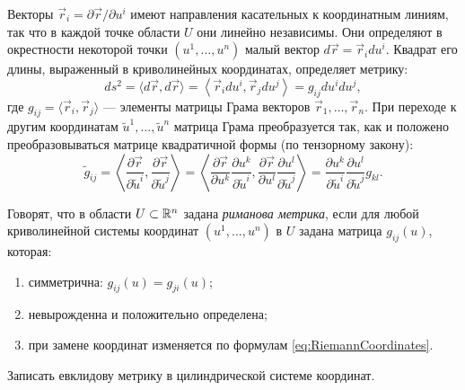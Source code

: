 Векторы $\vec{r}_i = \partial \vec{r} / \partial u^i$ имеют направления касательных к координатным линиям, так что в каждой точке области $U$ они линейно независимы. Они определяют в окрестности некоторой точки $(u^1, \ldots, u^n)$ малый вектор $d\vec{r} = \vec{r}_idu^i$. Квадрат его длины, выраженный в криволинейных координатах, определяет метрику:
\[
	ds^2 = \langle d\vec{r}, d\vec{r}\rangle = \left\langle\vec{r}_idu^i, \vec{r}_jdu^j\right\rangle = g_{ij}du^idu^j,
\]
где $g_{ij} = \langle\vec{r}_i, \vec{r}_j\rangle$ --- элементы матрицы Грама векторов $\vec{r}_1, \ldots, \vec{r}_n$. При переходе к другим координатам $\widetilde{u}^1, \ldots, \widetilde{u}^n$ матрица Грама преобразуется так, как и положено преобразовываться матрице квадратичной формы (по тензорному закону):
\begin{equation} \label{eq:RiemannCoordinates}
	\widetilde{g}_{ij} = \left\langle\frac{\partial \vec{r}}{\partial\widetilde{u}^i}, \frac{\partial \vec{r}}{\partial\widetilde{u}^j}\right\rangle = \left\langle\frac{\partial \vec{r}}{\partial u^k}\frac{\partial u^k}{\partial\widetilde{u}^i}, \frac{\partial \vec{r}}{\partial u^l}\frac{\partial u^l}{\partial\widetilde{u}^j}\right\rangle = \frac{\partial u^k}{\partial\widetilde{u}^i}\frac{\partial u^l}{\partial\widetilde{u}^j}g_{kl}.
\end{equation}

\begin{definition} \label{definition:RiemannMetrics}
	Говорят, что в области $U \subset \mathbb{R}^n$ задана \textit{риманова метрика}, если для любой криволинейной системы координат $(u^1, \ldots, u^n)$ в $U$ задана матрица $g_{ij}(u)$, которая:
	\begin{enumerate}[nolistsep, label=(\arabic*)]
		\item симметрична: $g_{ij}(u) = g_{ji}(u)$;
		\item невырожденна и положительно определена;
		\item при замене координат изменяется по формулам \eqref{eq:RiemannCoordinates}.
	\end{enumerate}
\end{definition}

\begin{problem} \label{problem:CylindricalMetric}
	Записать евклидову метрику в цилиндрической системе координат.
\end{problem}


